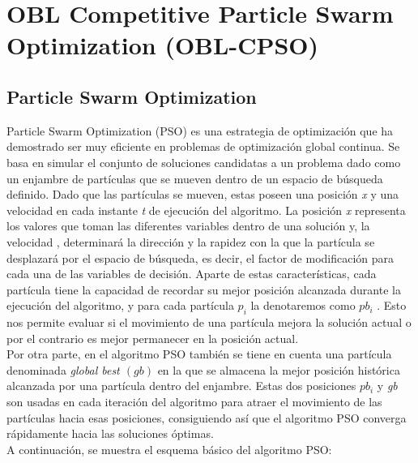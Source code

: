 
\bigskip

\section{OBL Competitive Particle Swarm Optimization (OBL-CPSO)}
\label{sec:OBL-CPSO}

\subsection{Particle Swarm Optimization}
Particle Swarm Optimization (PSO) \cite{metabook, comparison, PSO_KA, GPSO} es una estrategia de optimización que ha demostrado ser muy eficiente en problemas de optimización global continua. Se basa en simular el conjunto de soluciones candidatas a un problema dado como un enjambre de partículas que se mueven dentro de un espacio de búsqueda definido. Dado que las partículas se mueven, estas poseen una posición \textit{x} y una velocidad  en cada instante \textit{t} de ejecución del algoritmo. La posición \textit{x} representa los valores que toman las diferentes variables dentro de una solución y, la velocidad , determinará la dirección y la rapidez con la que la partícula se desplazará por el espacio de búsqueda, es decir, el factor de modificación para cada una de las variables de decisión. Aparte de estas características, cada partícula tiene la capacidad de recordar su mejor posición alcanzada durante la ejecución del algoritmo, y para cada partícula $p_{i}$ la denotaremos como $pb_{i}$ \cite{metabook}. Esto nos permite evaluar si el movimiento de una partícula mejora la solución actual o por el contrario es mejor permanecer en la posición actual. \\

Por otra parte, en el algoritmo PSO también se tiene en cuenta una partícula denominada \textit{global best $(gb)$} en la que se almacena la mejor posición histórica alcanzada por una partícula dentro del enjambre. Estas dos posiciones $pb_{i}$ y \textit{gb} son usadas en cada iteración del algoritmo para atraer el movimiento de las partículas hacia esas posiciones, consiguiendo así que el algoritmo PSO converga rápidamente hacia las soluciones óptimas. \\
A continuación, se muestra el esquema básico del algoritmo PSO: 

\newpage


